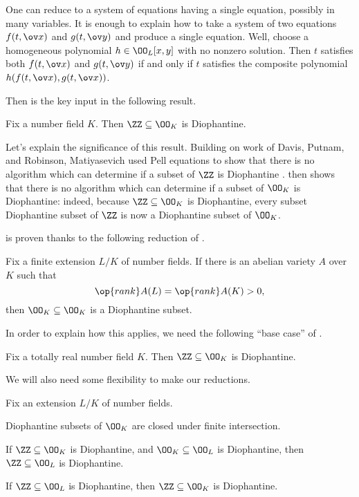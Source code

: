 \documentclass[../notes.tex]{subfiles}
\begin{document}
\begin{remark}
	One can reduce to a system of equations having a single equation, possibly in many variables. It is enough to explain how to take a system of two equations $f(t,\ov x)$ and $g(t,\ov y)$ and produce a single equation. Well, choose a homogeneous polynomial $h\in\OO_L[x,y]$ with no nonzero solution. Then $t$ satisfies both $f(t,\ov x)$ and $g(t,\ov y)$ if and only if $t$ satisfies the composite polynomial $h(f(t,\ov x),g(t,\ov x))$.
\end{remark}
Then  is the key input in the following result.
\begin{theorem} \label{thm:kp-application}
	Fix a number field $K$. Then $\ZZ\subseteq\OO_K$ is Diophantine.
\end{theorem}
\begin{remark}
	Let's explain the significance of this result. Building on work of Davis, Putnam, and Robinson, Matiyasevich used Pell equations to show that there is no algorithm which can determine if a subset of $\ZZ$ is Diophantine \cite{mati-h10}.  then shows that there is no algorithm which can determine if a subset of $\OO_K$ is Diophantine: indeed, because $\ZZ\subseteq\OO_K$ is Diophantine, every subset Diophantine subset of $\ZZ$ is now a Diophantine subset of $\OO_K$.
\end{remark}
 is proven thanks to the following reduction of \cite{shlap-elliptic-curve-h10}.
\begin{theorem} \label{thm:ab-var-bring-down-h10}
	Fix a finite extension $L/K$ of number fields. If there is an abelian variety $A$ over $K$ such that
	\[\op{rank}A(L)=\op{rank}A(K)>0,\]
	then $\OO_K\subseteq\OO_K$ is a Diophantine subset.
\end{theorem}
In order to explain how this applies, we need the following ``base case'' of \cite{denef-h10}.
\begin{theorem}[Denef] \label{thm:h10-real}
	Fix a totally real number field $K$. Then $\ZZ\subseteq\OO_K$ is Diophantine.
\end{theorem}
We will also need some flexibility to make our reductions.
\begin{proposition} \label{prop:h10-reductions}
	Fix an extension $L/K$ of number fields.
	\begin{listalph}
		\item Diophantine subsets of $\OO_K$ are closed under finite intersection.
		\item If $\ZZ\subseteq\OO_K$ is Diophantine, and $\OO_K\subseteq\OO_L$ is Diophantine, then $\ZZ\subseteq\OO_L$ is Diophantine.
		\item If $\ZZ\subseteq\OO_L$ is Diophantine, then $\ZZ\subseteq\OO_K$ is Diophantine.
	\end{listalph}
\end{proposition}
\end{document}
